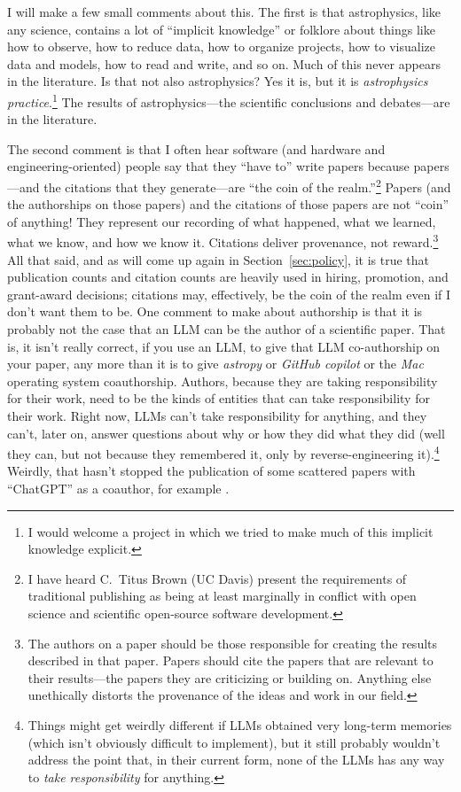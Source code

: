\documentclass{article}
\newcommand{\sectionname}{Section}
\newcommand{\secref}[1]{\sectionname~\ref{#1}}
\begin{document}
I will make a few small comments about this.
The first is that astrophysics, like any science, contains a lot of ``implicit knowledge'' or folklore about things like how to observe, how to reduce data, how to organize projects, how to visualize data and models, how to read and write, and so on.
Much of this never appears in the literature.
Is that not also astrophysics?
Yes it is, but it is \emph{astrophysics practice}.\footnote{I would welcome a project in which we tried to make much of this implicit knowledge explicit.}
The results of astrophysics---the scientific conclusions and debates---are in the literature.

The second comment is that I often hear software (and hardware and engineering-oriented) people say that they ``have to'' write papers because papers---and the citations that they generate---are ``the coin of the realm.''\footnote{%
I have heard C.~Titus Brown (UC Davis) present the requirements of traditional publishing as being at least marginally in conflict with open science and scientific open-source software development.}
Papers (and the authorships on those papers) and the citations of those papers are not ``coin'' of anything!
They represent our recording of what happened, what we learned, what we know, and how we know it.
Citations deliver provenance, not reward.\footnote{%
The authors on a paper should be those responsible for creating the results described in that paper.
Papers should cite the papers that are relevant to their results---the papers they are criticizing or building on.
Anything else unethically distorts the provenance of the ideas and work in our field.}
All that said, and as will come up again in \secref{sec:policy}, it is true that publication counts and citation counts are heavily used in hiring, promotion, and grant-award decisions; citations may, effectively, be the coin of the realm even if I don't want them to be.
One comment to make about authorship is that it is probably not the case that an LLM can be the author of a scientific paper.
That is, it isn't really correct, if you use an LLM, to give that LLM co-authorship on your paper, any more than it is to give \textsl{astropy} \cite{astropy} or \textsl{GitHub copilot} or the \textsl{Mac} operating system coauthorship.
Authors, because they are taking responsibility for their work, need to be the kinds of entities that can take responsibility for their work.
Right now, LLMs can't take responsibility for anything, and they can't, later on, answer questions about why or how they did what they did (well they can, but not because they remembered it, only by reverse-engineering it).\footnote{%
Things might get weirdly different if LLMs obtained very long-term memories (which isn't obviously difficult to implement), but it still probably wouldn't address the point that, in their current form, none of the LLMs has any way to \emph{take responsibility} for anything.}
Weirdly, that hasn't stopped the publication of some scattered papers with ``ChatGPT'' as a coauthor, for example \cite{chatauthor}.
\end{document}

